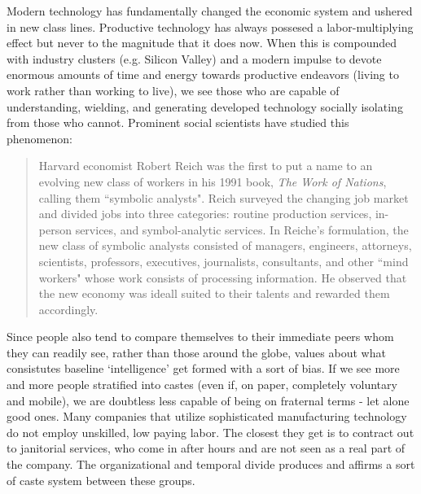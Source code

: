 \documentclass[letterpaper]{article}
\begin{document}
Modern technology has fundamentally changed the economic system and ushered in new class lines. Productive technology has always possesed a labor-multiplying effect but never to the magnitude that it does now. When this is compounded with industry clusters (e.g. Silicon Valley) and a modern impulse to devote enormous amounts of time and energy towards productive endeavors (living to work rather than working to live), we see those who are capable of understanding, wielding, and generating developed technology socially isolating from those who cannot. Prominent social scientists have studied this phenomenon:

\begin{quote}
  Harvard economist Robert Reich was the first to put a name to an evolving new class of workers in his 1991 book, \textit{The Work of Nations}, calling them ``symbolic analysts". Reich surveyed the changing job market and divided jobs into three categories: routine production services, in-person services, and symbol-analytic services. In Reiche's formulation, the new class of symbolic analysts consisted of managers, engineers, attorneys, scientists, professors, executives, journalists, consultants, and other ``mind workers" whose work consists of processing information. He observed that the new economy was ideall suited to their talents and rewarded them accordingly.
\end{quote}


Since people also tend to compare themselves to their immediate peers whom they can readily see, rather than those around the globe, values about what consistutes baseline `intelligence' get formed with a sort of bias. If we see more and more people stratified into castes (even if, on paper, completely voluntary and mobile), we are doubtless less capable of being on fraternal terms - let alone good ones. Many companies that utilize sophisticated manufacturing technology do not employ unskilled, low paying labor. The closest they get is to contract out to janitorial services, who come in after hours and are not seen as a real part of the company. The organizational and temporal divide produces and affirms a sort of caste system between these groups.
\end{document}
